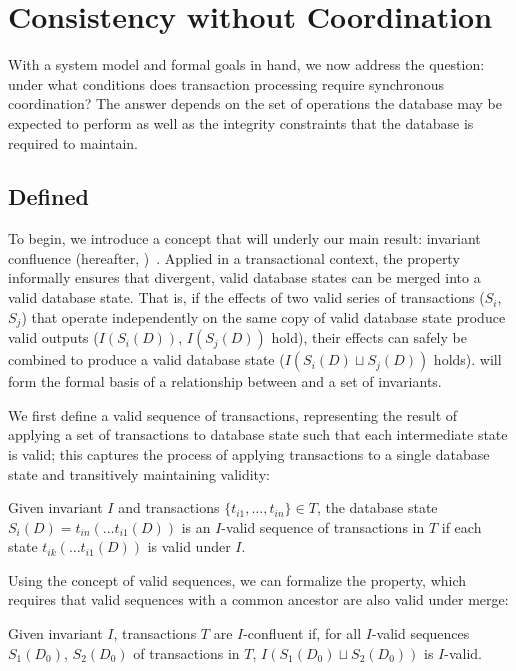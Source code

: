 
\section{Consistency without Coordination}
\label{sec:bcc-theory}

With a system model and formal goals in hand, we now address the
question: under what conditions does transaction processing require
synchronous coordination? The answer depends on the set of operations
the database may be expected to perform as well as the integrity
constraints that the database is required to maintain.

\subsection{\iconfluence Defined}

To begin, we introduce a concept that will underly our main result:
invariant confluence (hereafter,
\iconfluence)~\cite{obs-confluence}. Applied in a transactional
context, the \iconfluence property informally ensures that divergent,
valid database states can be merged into a valid database state. That
is, if the effects of two valid series of transactions ($S_i$, $S_j$)
that operate independently on the same copy of valid database state
produce valid outputs ($I(S_i(D))$, $I(S_j(D))$ hold), their effects
can safely be combined to produce a valid database state ($I(S_i(D)
\sqcup S_j(D))$ holds). \iconfluence will form the formal basis of a
relationship between \cfreedom and a set of invariants.

We first define a valid sequence of transactions, representing the
result of applying a set of transactions to database state such that
each intermediate state is valid; this captures the process of
applying transactions to a single database state and transitively
maintaining validity:

\begin{definition}
Given invariant $I$ and transactions $\{t_{i1}, \dots, t_{in}\} \in
T$, the database state $S_i(D) = t_{in}(\dots t_{i1}(D))$ is an
$I$-valid sequence of transactions in $T$ if each state $t_{ik}(\dots
t_{i1}(D))$ is valid under $I$.
\end{definition}

Using the concept of valid sequences, we can formalize the
\iconfluence property, which requires that valid sequences with a
common ancestor are also valid under merge:

\begin{definition}[\iconfluence]
Given invariant $I$, transactions $T$ are $I$-confluent if, for all
$I$-valid sequences $S_1(D_0)$, $S_2(D_0)$ of transactions in $T$,
$I(S_1(D_0) \sqcup S_2(D_0))$ is $I$-valid.
\end{definition}

